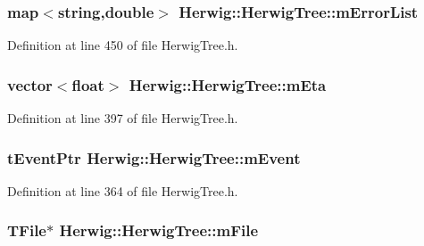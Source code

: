 \subsubsection[{\texorpdfstring{m\+Error\+List}{mErrorList}}]{\setlength{\rightskip}{0pt plus 5cm}map$<$string,double$>$ Herwig\+::\+Herwig\+Tree\+::m\+Error\+List\hspace{0.3cm}{\ttfamily [protected]}}\hypertarget{class_herwig_1_1_herwig_tree_aa58f96f1caffd3e013d2f341de98bf28}{}\label{class_herwig_1_1_herwig_tree_aa58f96f1caffd3e013d2f341de98bf28}


Definition at line 450 of file Herwig\+Tree.\+h.

\subsubsection[{\texorpdfstring{m\+Eta}{mEta}}]{\setlength{\rightskip}{0pt plus 5cm}vector$<$float$>$ Herwig\+::\+Herwig\+Tree\+::m\+Eta\hspace{0.3cm}{\ttfamily [protected]}}\hypertarget{class_herwig_1_1_herwig_tree_a16fc9feb3ba75e30c41e3842b0b324af}{}\label{class_herwig_1_1_herwig_tree_a16fc9feb3ba75e30c41e3842b0b324af}


Definition at line 397 of file Herwig\+Tree.\+h.

\subsubsection[{\texorpdfstring{m\+Event}{mEvent}}]{\setlength{\rightskip}{0pt plus 5cm}t\+Event\+Ptr Herwig\+::\+Herwig\+Tree\+::m\+Event\hspace{0.3cm}{\ttfamily [protected]}}\hypertarget{class_herwig_1_1_herwig_tree_af603e5812ed44d611aeaa66e7f6616f6}{}\label{class_herwig_1_1_herwig_tree_af603e5812ed44d611aeaa66e7f6616f6}


Definition at line 364 of file Herwig\+Tree.\+h.

\subsubsection[{\texorpdfstring{m\+File}{mFile}}]{\setlength{\rightskip}{0pt plus 5cm}T\+File$\ast$ Herwig\+::\+Herwig\+Tree\+::m\+File\hspace{0.3cm}{\ttfamily [protected]}}\hypertarget{class_herwig_1_1_herwig_tree_a8a5667ccbf263bd6e99590b5155d2c46}{}\label{class_herwig_1_1_herwig_tree_a8a5667ccbf263bd6e99590b5155d2c46}


